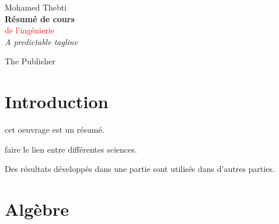 \newcommand*{\titleTH}{\begingroup %
\raggedleft %
\vspace*{\baselineskip} %

{\Large Mohamed Thebti}\\[0.167\textheight] %

{\LARGE\bfseries Résumé de cours}\\[\baselineskip] %

{\textcolor{Red}{\Huge de l'ingénierie}}\\[\baselineskip] %

{\Large \textit{A predictable tagline}}\par %

\vfill %

{\large The Publisher \plogo}\par %

\vspace*{3\baselineskip} %
\endgroup}


 

\titleTH %


\setlength{\parindent}{0cm}

\newpage
\tableofcontents

\newpage
\section{Introduction}

cet oeuvrage est un résumé. 

faire le lien entre différentes sciences.

Des résultats développés dans une partie sont utilisés dans d'autres parties.

\newpage
\section{Algèbre}

